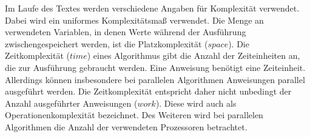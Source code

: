Im Laufe des Textes werden verschiedene Angaben für Komplexität verwendet.
Dabei wird ein uniformes Komplexitätsmaß verwendet.
Die Menge an verwendeten Variablen, in denen Werte während der Ausführung
zwischengespeichert werden, ist die Platzkomplexität ($space$).
Die Zeitkomplexität ($time$) eines Algorithmus gibt die Anzahl der
Zeiteinheiten an, die zur Ausführung gebraucht werden.
Eine Anweisung benötigt eine Zeiteinheit.
Allerdings können insbesondere bei parallelen Algorithmen Anweisungen parallel
ausgeführt werden.
Die Zeitkomplexität entspricht daher nicht unbedingt der Anzahl ausgeführter
Anweisungen ($work$).
Diese wird auch als Operationenkomplexität bezeichnet.
Des Weiteren wird bei parallelen Algorithmen die Anzahl der verwendeten
Prozessoren betrachtet.
